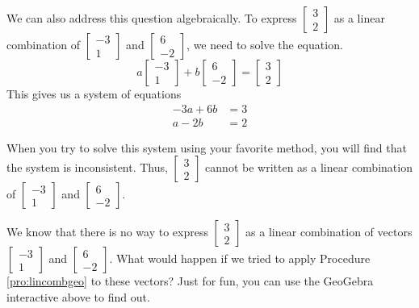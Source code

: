 \documentclass{ximera}
\begin{document}
\begin{example}
\begin{explanation}
We can also address this question algebraically.  To express $\begin{bmatrix}3\\2\end{bmatrix}$ as a linear combination of $\begin{bmatrix}-3\\1\end{bmatrix}$ and $\begin{bmatrix}6\\-2\end{bmatrix}$, we need to solve the equation.
$$a\begin{bmatrix}-3\\1\end{bmatrix}+b\begin{bmatrix}6\\-2\end{bmatrix}=\begin{bmatrix}3\\2\end{bmatrix}$$
This gives us a system of equations
\begin{align*}
-3a+6b&=3\\
a-2b&=2
\end{align*}

When you try to solve this system using your favorite method, you will find that the system is inconsistent.  Thus, $\begin{bmatrix}3\\2\end{bmatrix}$ cannot be written as a linear combination of $\begin{bmatrix}-3\\1\end{bmatrix}$ and $\begin{bmatrix}6\\-2\end{bmatrix}$.

We know that there is no way to express $\begin{bmatrix}3\\2\end{bmatrix}$ as a linear combination of vectors $\begin{bmatrix}-3\\1\end{bmatrix}$ and $\begin{bmatrix}6\\-2\end{bmatrix}$.  What would happen if we tried to apply Procedure \ref{pro:lincombgeo} to these vectors?  Just for fun, you can use the GeoGebra interactive above to find out.

\end{explanation}
\end{example}
\end{document}
